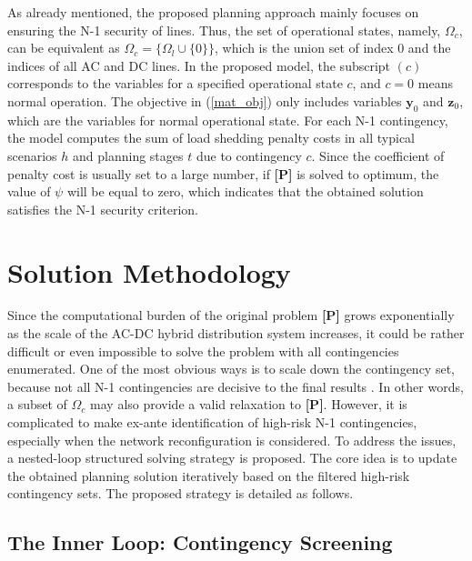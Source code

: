 \documentclass[a4paper,fleqn]{cas-dc}
\begin{document}
As already mentioned, the proposed planning approach mainly focuses on 
ensuring the N-1 security of lines. Thus, the set of operational states, 
namely, $ \Omega_{c} $, can be equivalent as 
$ \Omega_{c} = \{ \Omega_{l} \cup \{0\} \} $, which is the union set of index
$ 0 $ and the indices of all AC and DC lines. In the proposed model, the 
subscript $ (c) $ corresponds to the variables for a specified operational 
state $ c $, and $ c = 0 $ means normal operation. The objective in
(\ref{mat_obj}) only includes variables $ \boldsymbol{y}_{0} $ and 
$ \boldsymbol{z}_{0} $, which are the variables for normal operational 
state. For each N-1 contingency, the model computes the sum of 
load shedding penalty costs in all typical scenarios $ h $ and planning 
stages $ t $ due to contingency $ c $. Since the coefficient of penalty 
cost is usually set to a large number, if \textbf{[P]} is solved to optimum,
the value of $ \psi $ will be equal to zero, which indicates that the 
obtained solution satisfies the N-1 security criterion.

\vspace{1.6mm}

\section{Solution Methodology}\label{}

Since the computational burden of the original problem \textbf{[P]} grows 
exponentially as the scale of the AC-DC hybrid distribution system increases,
it could be rather difficult or even impossible to solve the problem with all 
contingencies enumerated. One of the most obvious ways is to scale down the 
contingency set, because not all N-1 contingencies are decisive to the
final results \cite{Lin_2019_Distribution}. In other words, a subset of 
$ \Omega_{c} $ may also provide a valid relaxation to \textbf{[P]}. 
However, it is complicated to make ex-ante identification of high-risk 
N-1 contingencies, especially when the network reconfiguration is considered. 
To address the issues, a nested-loop structured solving strategy is proposed.
The core idea is to update the obtained planning solution iteratively based 
on the filtered high-risk contingency sets. The proposed strategy is 
detailed as follows.

\subsection{The Inner Loop: Contingency Screening}
\end{document}
